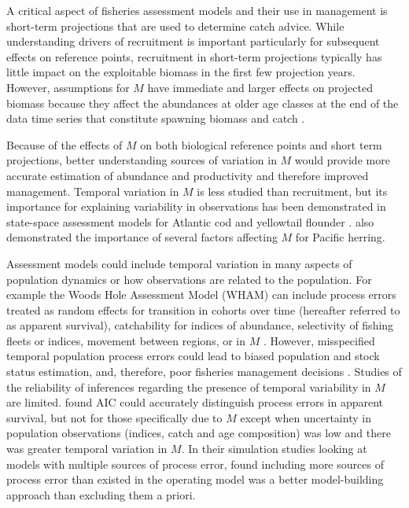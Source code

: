 \documentclass[
  12pt,
]{article}
\begin{document}
A critical aspect of fisheries assessment models and their use in management is short-term projections that are used to determine catch advice. While understanding drivers of recruitment is important particularly for subsequent effects on reference points, recruitment in short-term projections typically has little impact on the exploitable biomass in the first few projection years. However, assumptions for \(M\) have immediate and larger effects on projected biomass because they affect the abundances at older age classes at the end of the data time series that constitute spawning biomass and catch \citep{brodziaketal08, stocketal21}.

Because of the effects of \(M\) on both biological reference points and short term projections, better understanding sources of variation in \(M\) would provide more accurate estimation of abundance and productivity and therefore improved management. Temporal variation in \(M\) is less studied than recruitment, but its importance for explaining variability in observations has been demonstrated in state-space assessment models for Atlantic cod and yellowtail flounder \citep{cadigan16, stocketal21}. \citet{derisoetal08} also demonstrated the importance of several factors affecting \(M\) for Pacific herring.

Assessment models could include temporal variation in many aspects of population dynamics or how observations are related to the population. For example the Woods Hole Assessment Model (WHAM) can include process errors treated as random effects for transition in cohorts over time (hereafter referred to as apparent survival), catchability for indices of abundance, selectivity of fishing fleets or indices, movement between regions, or in \(M\) \citep{stockmiller21, milleretal_inreview}. However, misspecified temporal population process errors could lead to biased population and stock status estimation, and, therefore, poor fisheries management decisions \citep{legaultpalmer16, szuwalskietal18}. Studies of the reliability of inferences regarding the presence of temporal variability in \(M\) are limited. \citet{milleretal_inreview1} found AIC could accurately distinguish process errors in apparent survival, but not for those specifically due to \(M\) except when uncertainty in population observations (indices, catch and age composition) was low and there was greater temporal variation in \(M\). In their simulation studies looking at models with multiple sources of process error, \citet{lietal24} found including more sources of process error than existed in the operating model was a better model-building approach than excluding them a priori.
\end{document}
